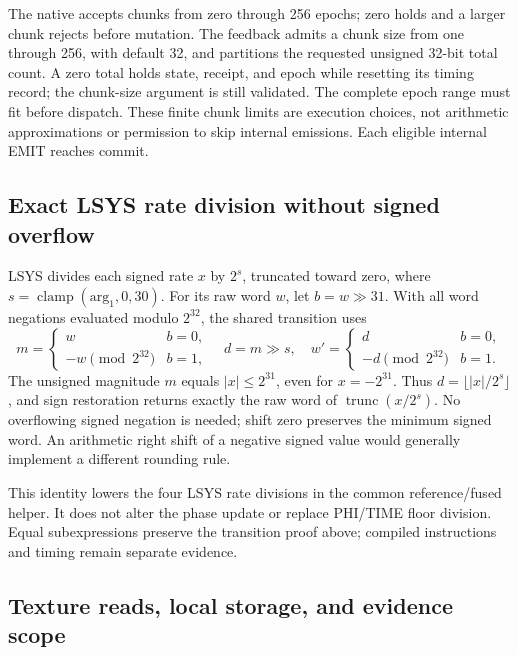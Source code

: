 The native  accepts chunks from zero through
256 epochs; zero holds and a larger chunk rejects before mutation.
The feedback  admits a chunk size from one
through 256, with default 32, and partitions the requested unsigned
32-bit total count. A zero total holds state, receipt, and epoch while
resetting its timing record; the chunk-size argument is still validated.
The complete epoch range must fit before dispatch. These finite chunk
limits are execution choices, not arithmetic approximations or permission
to skip internal emissions. Each eligible internal EMIT reaches commit.

\subsection{Exact LSYS rate division without signed overflow}

LSYS divides each signed rate $x$ by $2^s$, truncated toward zero,
where $s=\operatorname{clamp}(\mathrm{arg}_1,0,30)$.
For its raw word $w$, let $b=w\gg31$. With all word negations
evaluated modulo $2^{32}$, the shared transition uses
\begin{equation}
 m=\begin{cases}w&b=0,\\-w\pmod{2^{32}}&b=1,\end{cases}
 \quad d=m\gg s,\quad
 w'=\begin{cases}d&b=0,\\-d\pmod{2^{32}}&b=1.\end{cases}
 \label{eq:r17-trunc-shift}
\end{equation}
The unsigned magnitude $m$ equals $|x|\leq2^{31}$, even for
$x=-2^{31}$. Thus $d=\lfloor |x|/2^s\rfloor$, and sign restoration
returns exactly the raw word of $\operatorname{trunc}(x/2^s)$.
No overflowing signed negation is needed; shift zero preserves
the minimum signed word. An arithmetic right shift of a negative
signed value would generally implement a different rounding rule.

This identity lowers the four LSYS rate divisions in the common
reference/fused helper. It does not alter the phase update or replace
PHI/TIME floor division. Equal subexpressions preserve the transition
proof above; compiled instructions and timing remain separate evidence.

\subsection{Texture reads, local storage, and evidence scope}

